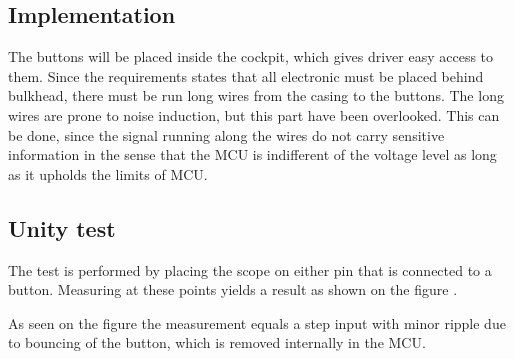 \subsection{Implementation}
The buttons will be placed inside the cockpit, which gives driver easy access to them. Since the requirements states that all electronic must be placed behind bulkhead, there must be run long wires from the casing to the buttons. The long wires are prone to noise induction, but this part have been overlooked. This can be done, since the signal running along the wires do not carry sensitive information in the sense that the MCU is indifferent of the voltage level as long as it upholds the limits of MCU.

\subsection{Unity test}
The test is performed by placing the scope on either pin that is connected to a button. Measuring at these points yields a result as shown on the figure .

As seen on the figure  the measurement equals a step input with minor ripple due to bouncing of the button, which is removed internally in the MCU. 